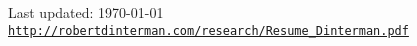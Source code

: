 \documentclass[letterpaper]{article}
\def\footerlink{http://robertdinterman.com/research/Resume_Dinterman.pdf}
\renewenvironment{itemize}{
  \begin{list}{}{
    \setlength{\leftmargin}{1.5em}
  }
}{
  \end{list}
}
\begin{document}

\bigskip

\begin{center}
  \begin{footnotesize}
    Last updated: \today \\
    \href{\footerlink}{\texttt{http://robertdinterman.com/research/Resume\_Dinterman.pdf}}
  \end{footnotesize}
\end{center}
\end{document}
